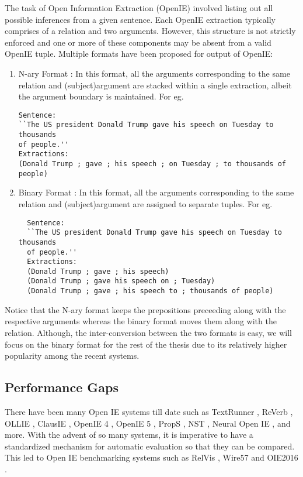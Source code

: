   The task of Open Information Extraction (OpenIE) involved listing out all possible inferences from a given sentence. Each OpenIE extraction typically comprises of a relation and two arguments. However, this structure is not strictly enforced and one or more of these components may be absent from a valid OpenIE tuple. Multiple formats have been proposed for output of OpenIE:
  \begin{enumerate}
    \item N-ary Format : In this format, all the arguments corresponding to the same relation and (subject)argument are stacked within a single extraction, albeit the argument boundary is maintained. For eg.
\begin{verbatim}
Sentence:
``The US president Donald Trump gave his speech on Tuesday to thousands
of people.''
Extractions:
(Donald Trump ; gave ; his speech ; on Tuesday ; to thousands of people)
\end{verbatim}

    \item Binary Format : In this format, all the arguments corresponding to the same relation and (subject)argument are assigned to separate tuples. For eg.
\begin{verbatim}
  Sentence:
  ``The US president Donald Trump gave his speech on Tuesday to thousands
  of people.''
  Extractions:
  (Donald Trump ; gave ; his speech)
  (Donald Trump ; gave his speech on ; Tuesday)
  (Donald Trump ; gave ; his speech to ; thousands of people)
\end{verbatim}
  \end{enumerate}

  Notice that the N-ary format keeps the prepositions preceeding along with the respective arguments whereas the binary format moves them along with the relation. Although, the inter-conversion between the two formats is easy, we will focus on the binary format for the rest of the thesis due to its relatively higher popularity among the recent systems.
    
  \subsection{Performance Gaps}

  There have been many Open IE systems till date such as TextRunner \citep{TextRunner}, ReVerb \citep{ReVerb1, ReVerb2}, OLLIE \citep{Ollie}, ClausIE \citep{Clausie}, OpenIE 4 \citep{Openie-4a, Openie-4b}, OpenIE 5 \citep{OpenIE-5a, OpenIE-5b}, PropS \citep{PropS}, NST \citep{Nst},  Neural Open IE \citep{cui&al18}, and more. With the advent of so many systems, it is imperative to have a standardized mechanism for automatic evaluation so that they can be compared. This led to Open IE benchmarking systems such as RelVis \citep{Relvis}, Wire57 \citep{Wire57} and OIE2016 \citep{OIE2016}.


